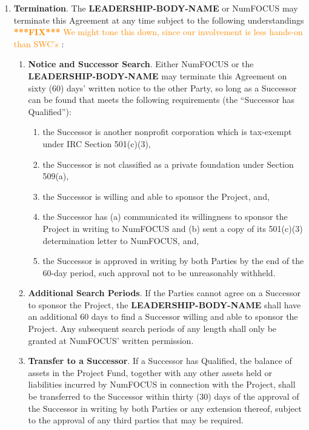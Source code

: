 \documentclass[english,letterpaper,12pt]{article}
\newcommand{\fix}[1]{
  \textcolor{darkorange} { \textbf{***FIX***} #1 } }
\newcommand{\leadershipbody}{\textbf{LEADERSHIP-BODY-NAME}}
\begin{document}
\begin{enumerate}[label=\arabic*.,ref=\S~\arabic*]
\item \textbf{Termination}. \label{Termination} The \leadershipbody{} or
  NumFOCUS may terminate this Agreement at any time subject to the following
  understandings \fix{We might tone this down, since our involvement is less
    hands-on than SWC's}:

\begin{enumerate}[label=\alph*.,ref=\theenumi(\arabic*)]

\item \textbf{Notice and Successor Search}. Either NumFOCUS or the
  \leadershipbody{} may terminate this Agreement on sixty (60) days' written
  notice to the other Party, so long as a Successor can be found that meets the
  following requirements (the ``Successor has Qualified''):


\begin{enumerate}[label=\roman*.,ref=\theenumi(\alph{enumii})(\roman*)]
  
\item the Successor is another nonprofit corporation which is tax-exempt under
  IRC Section 501(c)(3),
  
\item the Successor is not classified as a private foundation under Section
  509(a),
  
\item the Successor is willing and able to sponsor the Project, and,
  
\item the Successor has (a) communicated its willingness to sponsor the Project
  in writing to NumFOCUS and (b) sent a copy of its 501(c)(3) determination
  letter to NumFOCUS, and,
  
\item the Successor is approved in writing by both Parties by the end of the
  60-day period, such approval not to be unreasonably withheld.
  
\end{enumerate}

\item \textbf{Additional Search Periods}. If the Parties cannot agree on a
  Successor to sponsor the Project, the \leadershipbody{} shall have an
  additional 60 days to find a Successor willing and able to sponsor the
  Project. Any subsequent search periods of any length shall only be granted at
  NumFOCUS' written permission.

\item \textbf{Transfer to a Successor}. If a Successor has Qualified, the
  balance of assets in the Project Fund, together with any other assets held or
  liabilities incurred by NumFOCUS in connection with the Project, shall be
  transferred to the Successor within thirty (30) days of the approval of the
  Successor in writing by both Parties or any extension thereof, subject to the
  approval of any third parties that may be required.


\end{enumerate}
\end{enumerate}
\end{document}
